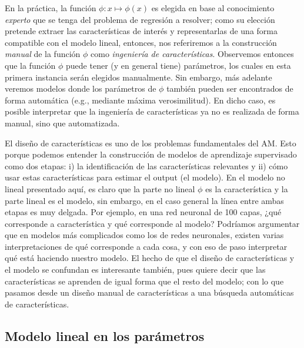 En la práctica, la función $\phi:x\mapsto\phi(x)$ es elegida en base  al conocimiento \emph{experto} que se tenga del problema de regresión a resolver;  como su elección pretende extraer las características de interés y representarlas  de una forma compatible con el modelo lineal, entonces, nos referiremos a la construcción \emph{manual} de la función $\phi$ como \emph{ingeniería de características}. Observemos entonces que la función $\phi$ puede tener (y en general tiene) parámetros, los cuales en esta primera instancia serán elegidos manualmente. Sin embargo, más adelante veremos modelos donde los parámetros de $\phi$ también pueden ser encontrados de forma automática (e.g., mediante máxima verosimilitud). En dicho caso, es posible interpretar que la ingeniería de características ya no es realizada de forma manual, sino que automatizada.  



\begin{mdframed}[style=discusion, frametitle={\center Características y modelos}]
El diseño de características es uno de los problemas fundamentales del AM. Esto porque podemos entender la construcción de modelos de aprendizaje supervisado como dos etapas: i) la identificación de las características relevantes y ii) cómo usar estas características para estimar el output (el modelo). En el modelo no lineal presentado aquí, es claro que la parte no lineal $\phi$ es la característica y la parte lineal es el modelo, sin embargo, en el caso general la línea entre ambas etapas es muy delgada.  Por ejemplo, en una red neuronal de 100 capas, ¿qué corresponde a característica y qué corresponde al modelo? Podríamos argumentar que en modelos más complicados como los de redes neuronales, existen varias interpretaciones de qué corresponde a cada cosa, y con eso de paso interpretar qué está haciendo nuestro modelo. El hecho de que el diseño de características y el modelo se confundan es interesante también, pues quiere decir que las características se aprenden de igual forma que el resto del modelo; con lo que pasamos desde un diseño manual de características a una búsqueda automáticas de características. 

\end{mdframed}


\subsection{Modelo lineal en los parámetros} 
\label{sub:modelo_lineal_param}


